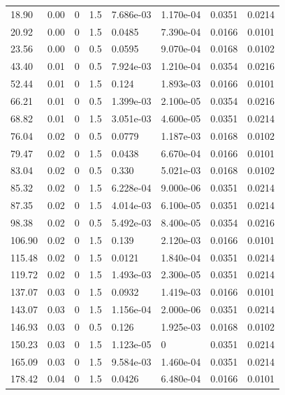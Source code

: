 \documentclass[preview]{standalone}
\begin{document}
{{\begin{tabular}{L{1.2cm}C{1.2cm} C{0.3cm}C{0.5cm} C{1.4cm}C{1.4cm} C{1.4cm}C{1.4cm}}
  18.90  &  0.00  & 0     & 1.5 &  7.686e-03  & 1.170e-04  & 0.0351 &  0.0214   \\ 
  20.92  &  0.00  & 0     & 1.5 &  0.0485  & 7.390e-04  & 0.0166 &  0.0101   \\ 
  23.56  &  0.00  & 0     & 0.5 &  0.0595  & 9.070e-04  & 0.0168 &  0.0102   \\ 
  43.40  &  0.01  & 0     & 0.5 &  7.924e-03  & 1.210e-04  & 0.0354 &  0.0216   \\ 
  52.44  &  0.01  & 0     & 1.5 &  0.124  & 1.893e-03  & 0.0166 &  0.0101   \\ 
  66.21  &  0.01  & 0     & 0.5 &  1.399e-03  & 2.100e-05  & 0.0354 &  0.0216   \\ 
  68.82  &  0.01  & 0     & 1.5 &  3.051e-03  & 4.600e-05  & 0.0351 &  0.0214   \\ 
  76.04  &  0.02  & 0     & 0.5 &  0.0779  & 1.187e-03  & 0.0168 &  0.0102   \\ 
  79.47  &  0.02  & 0     & 1.5 &  0.0438  & 6.670e-04  & 0.0166 &  0.0101   \\ 
  83.04  &  0.02  & 0     & 0.5 &  0.330  & 5.021e-03  & 0.0168 &  0.0102   \\ 
  85.32  &  0.02  & 0     & 1.5 &  6.228e-04  & 9.000e-06  & 0.0351 &  0.0214   \\ 
  87.35  &  0.02  & 0     & 1.5 &  4.014e-03  & 6.100e-05  & 0.0351 &  0.0214   \\ 
  98.38  &  0.02  & 0     & 0.5 &  5.492e-03  & 8.400e-05  & 0.0354 &  0.0216   \\ 
  106.90  &  0.02  & 0     & 1.5 &  0.139  & 2.120e-03  & 0.0166 &  0.0101   \\ 
  115.48  &  0.02  & 0     & 1.5 &  0.0121  & 1.840e-04  & 0.0351 &  0.0214   \\ 
  119.72  &  0.02  & 0     & 1.5 &  1.493e-03  & 2.300e-05  & 0.0351 &  0.0214   \\ 
  137.07  &  0.03  & 0     & 1.5 &  0.0932  & 1.419e-03  & 0.0166 &  0.0101   \\ 
  143.07  &  0.03  & 0     & 1.5 &  1.156e-04  & 2.000e-06  & 0.0351 &  0.0214   \\ 
  146.93  &  0.03  & 0     & 0.5 &  0.126  & 1.925e-03  & 0.0168 &  0.0102   \\ 
  150.23  &  0.03  & 0     & 1.5 &  1.123e-05  & 0  & 0.0351 &  0.0214   \\ 
  165.09  &  0.03  & 0     & 1.5 &  9.584e-03  & 1.460e-04  & 0.0351 &  0.0214   \\ 
  178.42  &  0.04  & 0     & 1.5 &  0.0426  & 6.480e-04  & 0.0166 &  0.0101   \\ 

\end{tabular}}}
\end{document}
